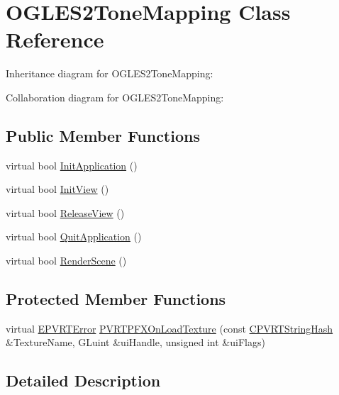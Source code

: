 \hypertarget{class_o_g_l_e_s2_tone_mapping}{\section{O\+G\+L\+E\+S2\+Tone\+Mapping Class Reference}
\label{class_o_g_l_e_s2_tone_mapping}
}


Inheritance diagram for O\+G\+L\+E\+S2\+Tone\+Mapping\+:


Collaboration diagram for O\+G\+L\+E\+S2\+Tone\+Mapping\+:
\subsection*{Public Member Functions}
\begin{DoxyCompactItemize}
\item 
virtual bool \hyperlink{class_o_g_l_e_s2_tone_mapping_aef7fdfa6fa92812171cfd9f571504274}{Init\+Application} ()
\item 
virtual bool \hyperlink{class_o_g_l_e_s2_tone_mapping_a4f8c043a8f538fb82a9bbe06f8dc94cb}{Init\+View} ()
\item 
virtual bool \hyperlink{class_o_g_l_e_s2_tone_mapping_ade6475c221f723def3a94fe6f5a672e3}{Release\+View} ()
\item 
virtual bool \hyperlink{class_o_g_l_e_s2_tone_mapping_a110b5b97096f677a444d3a2bcc2ff505}{Quit\+Application} ()
\item 
virtual bool \hyperlink{class_o_g_l_e_s2_tone_mapping_ab1bf60cd06760b9f269b472ffded0abd}{Render\+Scene} ()
\end{DoxyCompactItemize}
\subsection*{Protected Member Functions}
\begin{DoxyCompactItemize}
\item 
virtual \hyperlink{_p_v_r_t_error_8h_a9e837ff1a83f3a5f332bc4cc78454608}{E\+P\+V\+R\+T\+Error} \hyperlink{class_o_g_l_e_s2_tone_mapping_a1f8be1b9627360263ed24ac8d82534a3}{P\+V\+R\+T\+P\+F\+X\+On\+Load\+Texture} (const \hyperlink{class_c_p_v_r_t_string_hash}{C\+P\+V\+R\+T\+String\+Hash} \&Texture\+Name, G\+Luint \&ui\+Handle, unsigned int \&ui\+Flags)
\end{DoxyCompactItemize}


\subsection{Detailed Description}


